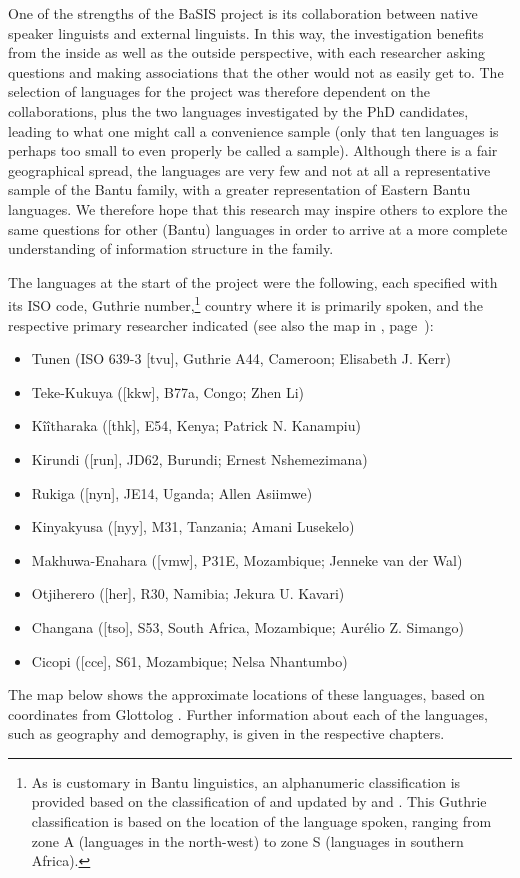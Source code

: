 \documentclass[output=paper]{langscibook}
\begin{document}
One of the strengths of the BaSIS project is its collaboration between native speaker linguists and external linguists. In this way, the investigation benefits from the inside as well as the outside perspective, with each researcher asking questions and making associations that the other would not as easily get to. The selection of languages for the project was therefore dependent on the collaborations, plus the two languages investigated by the PhD candidates, leading to what one might call a convenience sample (only that ten languages is perhaps too small to even properly be called a sample). Although there is a fair geographical spread, the languages are very few and not at all a representative sample of the Bantu family, with a greater representation of Eastern Bantu languages. We therefore hope that this research may inspire others to explore the same questions for other (Bantu) languages in order to arrive at a more complete understanding of information structure in the family. 

The languages at the start of the project were the following, each specified with its ISO code, Guthrie number,\footnote{As is customary in Bantu linguistics, an alphanumeric classification is provided based on the classification of \citet{Guthrie1948} and updated by \citet{Maho2003,Maho2009} and \citet{Hammarström2019}. This Guthrie classification is based on the location of the language spoken, ranging from zone A (languages in the north-west) to zone S (languages in southern Africa).} country where it is primarily spoken, and the respective primary researcher indicated (see also the map in , page~\pageref{fig:langmap}):

\begin{itemize}
\item Tunen (ISO 639-3 [tvu], Guthrie A44, Cameroon; Elisabeth J. Kerr)
\item  Teke-Kukuya ([kkw], B77a, Congo; Zhen Li)
\item  Kîîtharaka ([thk], E54, Kenya; Patrick N. Kanampiu)
\item  Kirundi ([run], JD62, Burundi; Ernest Nshemezimana)
\item  Rukiga ([nyn], JE14, Uganda; Allen Asiimwe)
\item  Kinyakyusa ([nyy], M31, Tanzania; Amani Lusekelo)
\item  Makhuwa-Enahara ([vmw], P31E, Mozambique; Jenneke van der Wal)
\item  Otjiherero ([her], R30, Namibia; Jekura U. Kavari)
\item  Changana ([tso], S53, South Africa, Mozambique; Aurélio Z. Simango)
\item  Cicopi ([cce], S61, Mozambique; Nelsa Nhantumbo)
\end{itemize}
The map below shows the approximate locations of these languages, based on coordinates from Glottolog \citep{HammarströmEtAl2022}. Further information about each of the languages, such as geography and demography, is given in the respective chapters.
\end{document}

